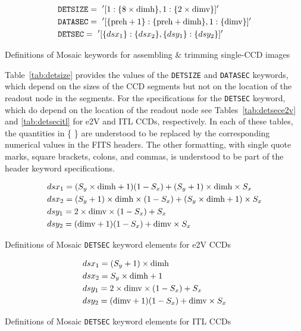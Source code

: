 \documentclass{article}[12pt]
\begin{document}
\begin{table}
\begin{align*}
& {\tt DETSIZE} =~'[1: \{8 \times {\rm dimh}\}, 1: \{2 \times {\rm dimv}\}]' \\
& {\tt DATASEC} =~'[ \{{\rm preh} + 1\} : \{{\rm preh} + {\rm dimh}\}, 1 :  \{{\rm dimv}\}]' \\
& {\tt DETSEC} =~'[ \{dsx_1\} : \{dsx_2\}, \{dsy_1\}: \{dsy_2\}]' \\
\end{align*}
\caption{Definitions of Mosaic keywords for assembling \& trimming single-CCD images\label{tab:detsize}}
\end{table}

Table~\ref{tab:detsize} provides the values of the {\tt DETSIZE} and {\tt DATASEC} keywords, which depend on the sizes of the CCD segments but not on the location of the readout node in the segments.  For the specifications for the {\tt DETSEC} keyword, which do depend on the location of the readout node see Tables~\ref{tab:detsece2v} and \ref{tab:detsecitl} for e2V and ITL CCDs, respectively.  In each of these tables, the quantities in \{ \} are understood to be replaced by the corresponding numerical values in the FITS headers.  The other formatting, with single quote marks, square brackets, colons, and commas, is understood to be part of the header keyword specifications.

\begin{table}
\begin{align*}
& dsx_1 = (S_y \times {\rm dimh} + 1)(1 - S_x) + (S_y + 1) \times {\rm dimh} \times S_x  \\
& dsx_2 = (S_y +1)  \times {\rm dimh} \times (1 - S_x) + (S_y \times {\rm dimh} + 1) \times S_x \\
& dsy_1 = 2 \times {\rm dimv} \times (1 - S_x) +  S_x \\
& dsy_2 = ({\rm dimv} + 1)(1 - S_x) + {\rm dimv}  \times S_x \\ 
\end{align*}
\caption{Definitions of Mosaic {\tt DETSEC} keyword elements for e2V CCDs\label{tab:detsece2v}}
\end{table}

\begin{table}
\begin{align*}
& dsx_1 = (S_y +1) \times {\rm dimh}  \\
& dsx_2 = S_y \times {\rm dimh} + 1 \\
& dsy_1 = 2 \times {\rm dimv} \times (1 - S_x) +  S_x \\
& dsy_2 = ({\rm dimv} + 1)(1 - S_x) + {\rm dimv}  \times S_x \\ 
\end{align*}
\caption{Definitions of Mosaic {\tt DETSEC} keyword elements for ITL CCDs\label{tab:detsecitl}}
\end{table}

%    
    
\end{document}
